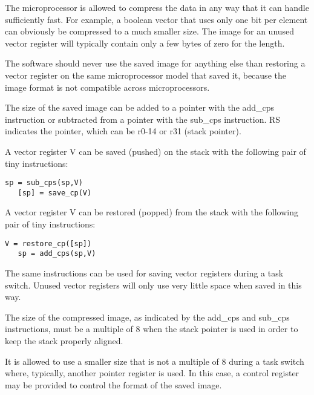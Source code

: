 \documentclass[forwardcom.tex]{subfiles}
\begin{document}
The microprocessor is allowed to compress the data in any way that it can handle sufficiently fast. For example, a boolean vector that uses only one bit per element can obviously be compressed to a much smaller size. The image for an unused vector register will typically contain only a few bytes of zero for the length.
\vspace{2mm}

The software should never use the saved image for anything else than restoring a vector register on the same microprocessor model that saved it, because the image format is not compatible across microprocessors.
\vspace{2mm}

The size of the saved image can be added to a pointer with the add\_cps instruction or subtracted from a pointer with the sub\_cps instruction. RS indicates the pointer, which can be r0-14 or r31 (stack pointer).
\vspace{2mm}

A vector register V can be saved (pushed) on the stack with the following pair of tiny instructions:

\begin{lstlisting}[frame=none]
   sp = sub_cps(sp,V)
   [sp] = save_cp(V)
\end{lstlisting}

A vector register V can be restored (popped) from the stack with the following pair of tiny instructions:

\begin{lstlisting}[frame=none]
   V = restore_cp([sp])
   sp = add_cps(sp,V)
\end{lstlisting}

The same instructions can be used for saving vector registers during a task switch. Unused vector registers will only use very little space when saved in this way.
\vspace{2mm}

The size of the compressed image, as indicated by the add\_cps and sub\_cps instructions, must be a multiple of 8 when the stack pointer is used in order to keep the stack properly aligned. 
\vspace{2mm}

It is allowed to use a smaller size that is not a multiple of 8 during a task switch where, typically, another pointer register is used. In this case, a control register may be provided to control the format of the saved image.
\vspace{2mm}
\end{document}
